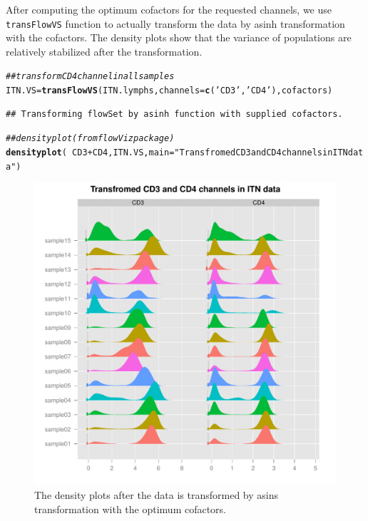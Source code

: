 \documentclass{article}\usepackage[]{graphicx}\usepackage[]{color}
\makeatletter
\def\maxwidth{ %
  \ifdim\Gin@nat@width>\linewidth
    \linewidth
  \else
    \Gin@nat@width
  \fi
}
\newcommand{\hlstr}[1]{\textcolor[rgb]{0.192,0.494,0.8}{#1}}%
\newcommand{\hlcom}[1]{\textcolor[rgb]{0.678,0.584,0.686}{\textit{#1}}}%
\newcommand{\hlopt}[1]{\textcolor[rgb]{0,0,0}{#1}}%
\newcommand{\hlstd}[1]{\textcolor[rgb]{0.345,0.345,0.345}{#1}}%
\newcommand{\hlkwb}[1]{\textcolor[rgb]{0.69,0.353,0.396}{#1}}%
\newcommand{\hlkwc}[1]{\textcolor[rgb]{0.333,0.667,0.333}{#1}}%
\newcommand{\hlkwd}[1]{\textcolor[rgb]{0.737,0.353,0.396}{\textbf{#1}}}%
\newenvironment{kframe}{%
 \def\at@end@of@kframe{}%
 \ifinner\ifhmode%
  \def\at@end@of@kframe{\end{minipage}}%
  \begin{minipage}{\columnwidth}%
 \fi\fi%
 \def\FrameCommand##1{\hskip\@totalleftmargin \hskip-\fboxsep
 \colorbox{shadecolor}{##1}\hskip-\fboxsep
     \hskip-\linewidth \hskip-\@totalleftmargin \hskip\columnwidth}%
 \MakeFramed {\advance\hsize-\width
   \@totalleftmargin\z@ \linewidth\hsize
   \@setminipage}}%
 {\par\unskip\endMakeFramed%
 \at@end@of@kframe}
\newenvironment{knitrout}{}{} %
\makeatother
\begin{document}
After computing the optimum cofactors for the requested channels, we use \texttt{transFlowVS} function to actually transform the data by asinh transformation with the cofactors.
The density plots show that the variance of populations are relatively stabilized after the transformation.
\begin{knitrout}
\color{fgcolor}\begin{kframe}
\begin{alltt}
\hlcom{## transform CD4 channel in all samples}
\hlstd{ITN.VS} \hlkwb{=} \hlkwd{transFlowVS}\hlstd{(ITN.lymphs,} \hlkwc{channels}\hlstd{=}\hlkwd{c}\hlstd{(}\hlstr{'CD3'}\hlstd{,} \hlstr{'CD4'}\hlstd{), cofactors)}
\end{alltt}
\begin{verbatim}
## Transforming flowSet by asinh function with supplied cofactors.
\end{verbatim}
\begin{alltt}
\hlcom{## density plot (from flowViz package)}
\hlkwd{densityplot}\hlstd{(}\hlopt{~}\hlstd{CD3}\hlopt{+}\hlstd{CD4, ITN.VS,} \hlkwc{main}\hlstd{=}\hlstr{"Transfromed CD3 and CD4 channels in ITN data"}\hlstd{)}
\end{alltt}
\end{kframe}\begin{figure}
\includegraphics[width=\maxwidth]{figure/densityITN-1} \caption[The density plots after the data is transformed by asins transformation with the optimum cofactors]{The density plots after the data is transformed by asins transformation with the optimum cofactors.}\label{fig:densityITN}
\end{figure}


\end{knitrout}
\end{document}
